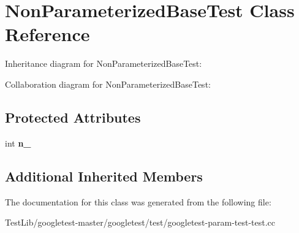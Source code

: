 \hypertarget{classNonParameterizedBaseTest}{}\section{Non\+Parameterized\+Base\+Test Class Reference}
\label{classNonParameterizedBaseTest}


Inheritance diagram for Non\+Parameterized\+Base\+Test\+:


Collaboration diagram for Non\+Parameterized\+Base\+Test\+:
\subsection*{Protected Attributes}
\begin{DoxyCompactItemize}
\item 
\mbox{\label{classNonParameterizedBaseTest_a617d4bbfd2aa5f6d41eea3089f7ad039}} 
int {\bfseries n\+\_\+}
\end{DoxyCompactItemize}
\subsection*{Additional Inherited Members}


The documentation for this class was generated from the following file\+:\begin{DoxyCompactItemize}
\item 
Test\+Lib/googletest-\/master/googletest/test/googletest-\/param-\/test-\/test.\+cc\end{DoxyCompactItemize}
